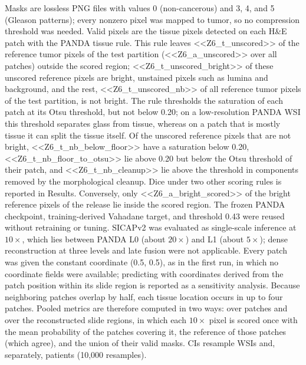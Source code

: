 \documentclass[10pt,letterpaper]{article}
\begin{document}
Masks are lossless PNG files with values 0 (non-cancerous) and 3, 4, and 5 (Gleason patterns); every nonzero pixel was mapped to tumor, so no compression threshold was needed. Valid pixels are the tissue pixels detected on each H\&E patch with the PANDA tissue rule. This rule leaves <<Z6_t_unscored>> of the reference tumor pixels of the test partition (<<Z6_a_unscored>> over all patches) outside the scored region; <<Z6_t_unscored_bright>> of these unscored reference pixels are bright, unstained pixels such as lumina and background, and the rest, <<Z6_t_unscored_nb>> of all reference tumor pixels of the test partition, is not bright. The rule thresholds the saturation of each patch at its Otsu threshold, but not below 0.20; on a low-resolution PANDA WSI this threshold separates glass from tissue, whereas on a patch that is mostly tissue it can split the tissue itself. Of the unscored reference pixels that are not bright, <<Z6_t_nb_below_floor>> have a saturation below 0.20, <<Z6_t_nb_floor_to_otsu>> lie above 0.20 but below the Otsu threshold of their patch, and <<Z6_t_nb_cleanup>> lie above the threshold in components removed by the morphological cleanup. Dice under two other scoring rules is reported in Results. Conversely, only <<Z6_a_bright_scored>> of the bright reference pixels of the release lie inside the scored region. The frozen PANDA checkpoint, training-derived Vahadane target, and threshold 0.43 were reused without retraining or tuning. SICAPv2 was evaluated as single-scale inference at $10\times$, which lies between PANDA L0 (about $20\times$) and L1 (about $5\times$); dense reconstruction at three levels and late fusion were not applicable. Every patch was given the constant coordinate (0.5, 0.5), as in the first run, in which no coordinate fields were available; predicting with coordinates derived from the patch position within its slide region is reported as a sensitivity analysis. Because neighboring patches overlap by half, each tissue location occurs in up to four patches. Pooled metrics are therefore computed in two ways: over patches and over the reconstructed slide regions, in which each $10\times$ pixel is scored once with the mean probability of the patches covering it, the reference of those patches (which agree), and the union of their valid masks. CIs resample WSIs and, separately, patients (10,000 resamples).
\end{document}
